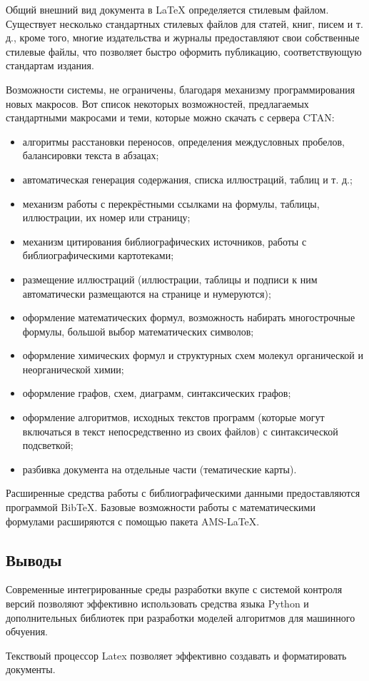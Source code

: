 Общий внешний вид документа в LaTeX определяется стилевым файлом. Существует несколько стандартных стилевых файлов для статей, книг, писем и т. д., кроме того, многие издательства и журналы предоставляют свои собственные стилевые файлы, что позволяет быстро оформить публикацию, соответствующую стандартам издания.

Возможности системы, не ограничены, благодаря механизму программирования новых макросов. Вот список некоторых возможностей, предлагаемых стандартными макросами и теми, которые можно скачать с сервера CTAN:
\begin{itemize}
	\item алгоритмы расстановки переносов, определения междусловных пробелов, балансировки текста в абзацах;
	\item автоматическая генерация содержания, списка иллюстраций, таблиц и т. д.;
	\item механизм работы с перекрёстными ссылками на формулы, таблицы, иллюстрации, их номер или страницу;
	\item механизм цитирования библиографических источников, работы с библиографическими картотеками;
	\item размещение иллюстраций (иллюстрации, таблицы и подписи к ним автоматически размещаются на странице и нумеруются);
	\item оформление математических формул, возможность набирать многострочные формулы, большой выбор математических символов;
	\item оформление химических формул и структурных схем молекул органической и неорганической химии;
	\item оформление графов, схем, диаграмм, синтаксических графов;
	\item оформление алгоритмов, исходных текстов программ (которые могут включаться в текст непосредственно из своих файлов) с синтаксической подсветкой;
	\item разбивка документа на отдельные части (тематические карты).
\end{itemize}
Расширенные средства работы с библиографическими данными предоставляются программой BibTeX. Базовые возможности работы с математическими формулами расширяются с помощью пакета AMS-LaTeX.

\subsection{Выводы}
Современные интегрированные среды разработки вкупе с системой контроля версий позволяют эффективно использовать средства языка Python  и дополнительных библиотек при разработки моделей алгоритмов для машинного обчуения.

Текствоый процессор Latex позволяет эффективно создавать и форматировать документы.